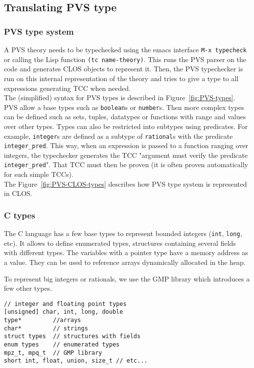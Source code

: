 \documentclass[12pt,a4paper]{article}
\newcommand{\cl}[1]{\texttt{#1}}
\begin{document}
\subsection{Translating PVS type}
\label{subsec:pvstypes}

\subsubsection{PVS type system}
A PVS theory needs to be typechecked using the emacs interface \cl{M-x typecheck} or calling the Lisp function \cl{(tc name-theory)}. This runs the PVS parser on the code and generates CLOS objects to represent it. Then, the PVS typechecker is run on this internal representation of the theory and tries to give a type to all expressions generating TCC when needed.\\

The (simplified) syntax for PVS types is described in Figure~\ref{fig:PVS-types}. PVS allow a base types such as \cl{boolean}s or \cl{number}s. Then more complex types can be defined such as sets, tuples, datatypes or functions with range and values over other types. Types can also be restricted into subtypes using predicates. For example, \cl{integer}s are defined as a subtype of \cl{rational}s with the predicate \cl{integer\_pred}. This way, when an expression is passed to a function ranging over integers, the typechecker generates the TCC "argument must verify the predicate \cl{integer\_pred}". That TCC must then be proven (it is often proven automatically for such simple TCCs). \\

The Figure~\ref{fig:PVS-CLOS-types} describes how PVS type system is represented in CLOS. 


\subsubsection{C types}
The C language \cite{huss2004c} has a few base types to represent bounded integers (\cl{int}, \cl{long}, etc). It allows to define enumerated types, structures containing several fields with different types. The variables with a pointer type have a memory address as a value. They can be used to reference arrays dynamically allocated in the heap.

To represent big integers or rationals, we use the GMP library which introduces a few other types.

\begin{lstlisting}[caption=C types]
// integer and floating point types
[unsigned] char, int, long, double
type*         //arrays
char*         // strings
struct types  // structures with fields
enum types    // enumerated types
mpz_t, mpq_t  // GMP library
short int, float, union, size_t // etc...
\end{lstlisting}
\end{document}
